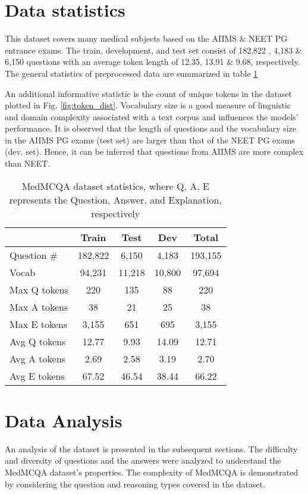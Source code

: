 \documentclass[pmlr,twocolumn,10pt]{jmlr}
\begin{document}
\section{Data statistics}
This dataset covers many medical subjects based on the AIIMS \& NEET PG entrance exams. The train, development, and test set consist of 182,822 , 4,183 \& 6,150 questions with an average token length of 12.35, 13.91 \& 9.68, respectively.
The general statistics of preprocessed data are summarized in table \ref{tab:data_split}



An additional informative statistic is the count of unique tokens in the dataset plotted in Fig. \ref{fig:token_dist}. Vocabulary size is a good measure of linguistic and domain complexity associated with a text corpus and influences the models' performance. It is observed that the length of questions and the vocabulary size in the AIIMS PG exams (test set) are larger than that of the NEET PG exams (dev. set). Hence, it can be inferred that questions from AIIMS are more complex than NEET.

\begin{table}[!ht]
\footnotesize
\centering
\begin{tabular}{lcccc}
\toprule
 & {\bf Train} & {\bf Test} & {\bf Dev} & {\bf Total} \\
\midrule
Question \#  &  182,822 & 6,150  & 4,183  & 193,155 \\
Vocab & 94,231& 11,218 & 10,800 & 97,694 \\
Max Q tokens & 220 & 135 & 88 & 220  \\
Max A tokens & 38 & 21 & 25& 38 \\
Max E tokens & 3,155 & 651& 695& 3,155 \\
Avg Q tokens & 12.77 & 9.93 & 14.09& 12.71 \\
Avg A tokens & 2.69& 2.58& 3.19& 2.70 \\
Avg E tokens & 67.52 & 46.54 & 38.44& 66.22 \\
\bottomrule
\end{tabular}
\caption{MedMCQA dataset statistics, where Q, A, E represents the Question, Answer, and Explanation, respectively}
\label{tab:data_split}
\vspace{-2ex}
\end{table}

\section{Data Analysis}
An analysis of the dataset is presented in the subsequent sections. The difficulty and diversity of questions and the answers were analyzed to understand the MedMCQA dataset's properties. The complexity of MedMCQA is demonstrated by considering the question and reasoning types covered in the dataset. 
\end{document}
